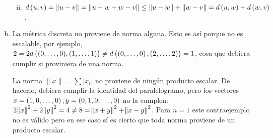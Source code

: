 \begin{eje}
\begin{enumerate}[(a)]
\begin{enumerate}[i)]
\begin{gather*}
                \end{gather*}
                \item $d\left( u, v \right) = \| u -v \| = \| u -w +w -v \| \leq \|u-w \| + \| w-v \|= d \left( u, w \right) + d \left( w, v \right)$.
            \end{enumerate}
        \item La métrica discreta no proviene de norma alguna. 
            Esto es así porque no es escalable, por ejemplo, 
            $2 = 2 d\left( (0, \dots, 0) , (1, \dots, 1) \right) \neq  
            d \left( \left(0, \dots, 0\right) , \left(2, \dots, 2\right) \right)  = 1$, cosa que debiera cumplir 
            si proviniera de una norma.

            
            La norma $\| x \| = \sum | x_i |$  
            no proviene de ningún producto escalar. De hacerlo, debiera cumplir la
            identidad del paralelogramo, pero los vectores
            $x = \left( 1, 0, \dots, 0 \right),
            y = \left( 0, 1, 0, \dots, 0  \right)$
            no la cumplen: $2\norm{x}^2 + 2\norm{y}^2 = 4 \neq 8 = \norm{x+y}^2
            + \norm{x-y}^2$. Para $n = 1$ este contraejemplo no es válido pero en
            ese caso sí es cierto que toda norma proviene de un producto escalar.
    \end{enumerate}
\end{eje}

